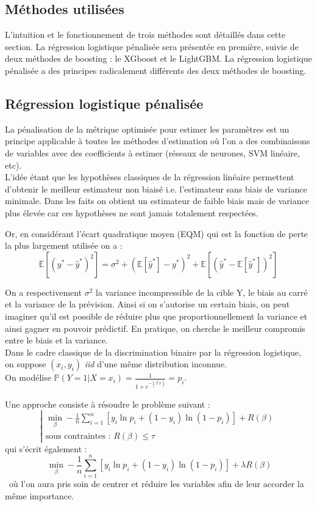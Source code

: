 \documentclass[french]{article}
\begin{document}
\begin{multicols}{2}
\section{Méthodes utilisées}
L'intuition et le fonctionnement de trois méthodes sont détaillés dans cette section. La régression logistique pénalisée sera présentée en première, suivie de deux méthodes de boosting : le XGboost et le LightGBM. La régression logistique pénalisée a des principes radicalement différents des deux méthodes de boosting.


\subsection{Régression logistique pénalisée}
La pénalisation de la métrique optimisée pour estimer les paramètres est un principe applicable à toutes les méthodes d'estimation où l’on a des combinaisons de variables avec des coefficients à estimer (réseaux de neurones, SVM linéaire, etc).\\
L'idée étant que les hypothèses classiques de la régression linéaire permettent d'obtenir le meilleur estimateur non biaisé i.e. l'estimateur sans biais de variance minimale. Dans les faits on obtient un estimateur de faible biais mais de variance plus élevée car ces hypothèses ne sont jamais totalement respectées.

Or, en considérant l'écart quadratique moyen (EQM) qui est la fonction de perte la plus largement utilisée on a : 
\[\mathbb{E}\left[\left(y^{*}-\hat{y}^{*}\right)^{2}\right]=\sigma^{2}+\left(\mathbb{E}\left[\hat{y}^{*}\right]-y^{*}\right)^{2}+\mathbb{E}\left[\left(\hat{y}^{*}-\mathbb{E}\left[\hat{y}^{*}\right]\right)^{2}\right] \]

On a respectivement $\sigma^{2}$ la variance incompressible de la cible Y, le biais au carré et la variance de la prévision. Ainsi si on s'autorise un certain biais, on peut imaginer qu'il est possible de réduire plus que proportionnellement la variance et ainsi gagner en pouvoir prédictif.
En pratique, on cherche le meilleur compromis entre le biais et la variance.\\
Dans le cadre classique de la discrimination binaire par la régression logistique, on suppose $(x_i,y_i)$ \emph{iid} d'une même distribution inconnue.\\
On modélise $\mathbb{P}(Y=1|X=x_i)=\frac{1}{1+e^{-\left(\beta^{\prime} x\right)}}=p_i$.

\noindent Une approche \cite{art3} consiste à résoudre le problème suivant : 
\[ \left| \begin{array}{l}\displaystyle\min_{\beta}-\frac{1}{n} \sum_{i=1}^{n} \left[y_{i} \ln p_{i}+\left(1-y_{i}\right) \ln \left(1-p_{i}\right)\right] + R(\beta) \\
\text{sous contraintes : } R (\beta) \leq \tau \end{array} \right.\]
qui s'écrit également : 
\[\ \displaystyle\min_{\beta}-\frac{1}{n} \sum_{i=1}^{n} \left[y_{i} \ln p_{i}+\left(1-y_{i}\right) \ln \left(1-p_{i}\right)\right] +\lambda R(\beta) \]\
où l'on aura pris soin de centrer et réduire les variables afin de leur accorder la même importance.
\\


\end{multicols}
\end{document}
